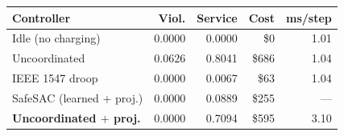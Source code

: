\begin{tabular}{lrrrr}
\toprule
Controller & Viol. & Service & Cost & ms/step \\
\midrule
Idle (no charging) & 0.0000 & 0.0000 & \$0 & 1.01 \\
Uncoordinated & 0.0626 & 0.8041 & \$686 & 1.04 \\
IEEE 1547 droop & 0.0000 & 0.0067 & \$63 & 1.04 \\
SafeSAC (learned $+$ proj.) & 0.0000 & 0.0889 & \$255 & --- \\
\textbf{Uncoordinated $+$ proj.} & 0.0000 & 0.7094 & \$595 & 3.10 \\
\bottomrule
\end{tabular}

